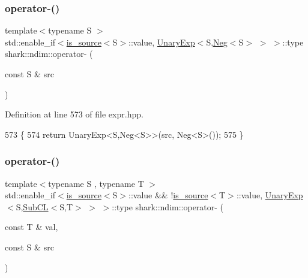 \subsubsection{\texorpdfstring{operator-\/()}{operator-()}\hspace{0.1cm}{\footnotesize\ttfamily [5/8]}}
{\footnotesize\ttfamily template$<$typename S $>$ \\
std\+::enable\+\_\+if$<$\hyperlink{classshark_1_1ndim_1_1is__source}{is\+\_\+source}$<$S$>$\+::value, \hyperlink{classshark_1_1ndim_1_1_unary_exp}{Unary\+Exp}$<$S,\hyperlink{classshark_1_1ndim_1_1_neg}{Neg}$<$S$>$ $>$ $>$\+::type shark\+::ndim\+::operator-\/ (\begin{DoxyParamCaption}\item[{const S \&}]{src }\end{DoxyParamCaption})}



Definition at line 573 of file expr.\+hpp.


\begin{DoxyCode}
573                                                                                                  \{
574             \textcolor{keywordflow}{return} UnaryExp<S,Neg<S>>(src, Neg<S>());
575         \}
\end{DoxyCode}
\hypertarget{namespaceshark_1_1ndim_a4668c407586ccab4c63c2a234670ea9e}{}\label{namespaceshark_1_1ndim_a4668c407586ccab4c63c2a234670ea9e} 
\subsubsection{\texorpdfstring{operator-\/()}{operator-()}\hspace{0.1cm}{\footnotesize\ttfamily [6/8]}}
{\footnotesize\ttfamily template$<$typename S , typename T $>$ \\
std\+::enable\+\_\+if$<$\hyperlink{classshark_1_1ndim_1_1is__source}{is\+\_\+source}$<$S$>$\+::value \&\& !\hyperlink{classshark_1_1ndim_1_1is__source}{is\+\_\+source}$<$T$>$\+::value, \hyperlink{classshark_1_1ndim_1_1_unary_exp}{Unary\+Exp}$<$S,\hyperlink{classshark_1_1ndim_1_1_sub_c_l}{Sub\+CL}$<$S,T$>$ $>$ $>$\+::type shark\+::ndim\+::operator-\/ (\begin{DoxyParamCaption}\item[{const T \&}]{val,  }\item[{const S \&}]{src }\end{DoxyParamCaption})}



